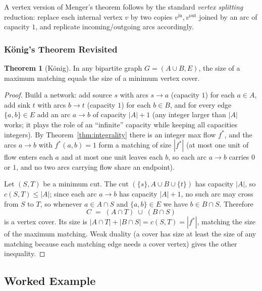 \documentclass{article}
\theoremstyle{definition}
\newtheorem{theorem}{Theorem}
\begin{document}
A vertex version of Menger's theorem follows by the standard
\emph{vertex splitting} reduction: replace each internal vertex $v$
by two copies $v^{\text{in}}, v^{\text{out}}$ joined by an arc of
capacity $1$, and replicate incoming/outgoing arcs accordingly.

\subsubsection{König's Theorem Revisited}

\begin{theorem}[König]
In any bipartite graph $G = (A \cup B, E)$, the size of a maximum
matching equals the size of a minimum vertex cover.
\end{theorem}

\begin{proof}
Build a network: add source $s$ with arcs $s \to a$ (capacity $1$)
for each $a \in A$, add sink $t$ with arcs $b \to t$ (capacity $1$)
for each $b \in B$, and for every edge $\{a, b\} \in E$ add an arc
$a \to b$ of capacity $|A| + 1$ (any integer larger than $|A|$ works; it
plays the role of an ``infinite'' capacity while keeping all capacities
integers). By Theorem~\ref{thm:integrality}
there is an integer max flow $f^*$, and the arcs $a \to b$ with
$f^*(a, b) = 1$ form a matching of size $|f^*|$ (at most one unit of
flow enters each $a$ and at most one unit leaves each $b$, so each arc
$a \to b$ carries $0$ or $1$, and no two arcs carrying flow share an
endpoint).

Let $(S, T)$ be a minimum cut. The cut $(\{s\}, A \cup B \cup \{t\})$ has
capacity $|A|$, so $c(S, T) \le |A|$; since each arc $a \to b$ has
capacity $|A| + 1$, no such arc may cross from $S$ to $T$, so
whenever $a \in A \cap S$ and $\{a, b\} \in E$ we have $b \in B \cap S$.
Therefore
\[
  C \;=\; (A \cap T) \;\cup\; (B \cap S)
\]
is a vertex cover. Its size is
$|A \cap T| + |B \cap S| = c(S, T) = |f^*|$, matching the size of
the maximum matching. Weak duality (a cover has size at least the
size of any matching because each matching edge needs a cover vertex)
gives the other inequality.
\end{proof}

\subsection{Worked Example}
\end{document}
